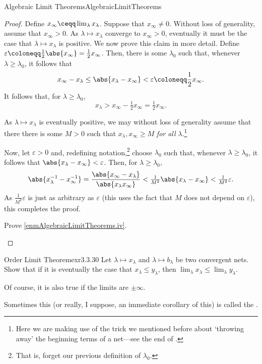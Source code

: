 \begin{prp}{Algebraic Limit Theorems}{AlgebraicLimitTheorems}
\begin{proof}
Define $x_{\infty}\ceqq \lim _{\lambda}x_{\lambda}$.  Suppose that $x_{\infty}\neq 0$.  Without loss of generality, assume that $x_{\infty}>0$.  As $\lambda \mapsto x_{\lambda}$ converge to $x_{\infty}>0$, eventually it must be the case that $\lambda \mapsto x_{\lambda}$ is positive.  We now prove this claim in more detail.  Define $\varepsilon \coloneqq \frac{1}{2}\abs{x_\infty}=\frac{1}{2}x_\infty$.  Then, there is some $\lambda _0$ such that, whenever $\lambda \geq \lambda _0$, it follows that
\begin{equation}
x_\infty -x_\lambda \leq \abs{x_\lambda -x_\infty}<\varepsilon \coloneqq \frac{1}{2}x_\infty .
\end{equation}
It follows that, for $\lambda \geq \lambda _0$,
\begin{equation}
x_\lambda >x_\infty -\tfrac{1}{2}x_\infty =\tfrac{1}{2}x_\infty .
\end{equation}

As $\lambda \mapsto x_\lambda$ is eventually positive, we may without loss of generality assume that there there is some $M>0$ such that $x_\lambda ,x_{\infty}\geq M$ \emph{for all} $\lambda$.\footnote{Here we are making use of the trick we mentioned before about `throwing away' the beginning terms of a net---see the end of .}

Now, let $\varepsilon >0$ and, redefining notation,\footnote{That is, forget our previous definition of $\lambda _0$.} choose $\lambda _0$ such that, whenever $\lambda \geq \lambda _0$, it follows that $\abs{x_\lambda -x_\infty}<\varepsilon$.  Then, for $\lambda \geq \lambda _0$,
\begin{equation}
\abs{x_\lambda ^{-1}-x_\infty ^{-1}}=\frac{\abs{x_\infty -x_\lambda}}{\abs{x_\lambda x_\infty}}<\tfrac{1}{M^2}\abs{x_\lambda -x_\infty}<\tfrac{1}{M^2}\varepsilon .
\end{equation}
As $\frac{1}{M^2}\varepsilon$ is just as arbitrary as $\varepsilon$ (this uses the fact that $M$ does not depend on $\varepsilon$), this completes the proof.
\begin{exr}[breakable=false]{}{}
Prove \cref{enmAlgebraicLimitTheorems.iv}.
\end{exr}
\end{proof}
\end{prp}
\begin{exr}{Order Limit Theorem}{exr3.3.30}
Let $\lambda \mapsto x_\lambda$ and $\lambda \mapsto b_\lambda$ be two convergent nets.  Show that if it is eventually the case that $x_\lambda \leq y_\lambda$, then $\lim _\lambda x_\lambda \leq \lim _\lambda y_\lambda$.
\begin{rmk}
Of course, it is also true if the limits are $\pm \infty$.
\end{rmk}
\begin{rmk}
Sometimes this (or really, I suppose, an immediate corollary of this) is called the .
\end{rmk}
\end{exr}
